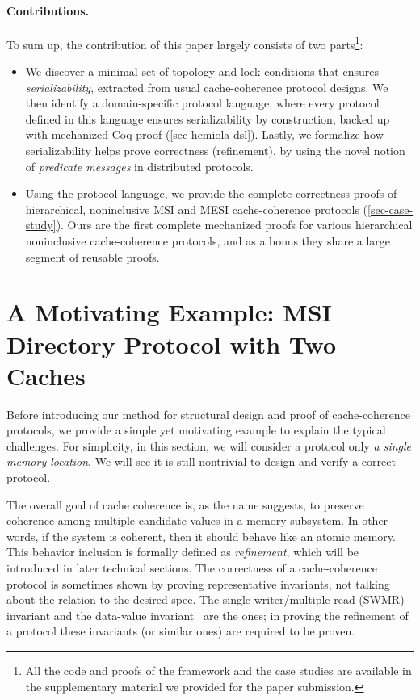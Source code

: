 \documentclass[sigplan,10pt,review,anonymous,screen]{acmart}\settopmatter{printfolios=true,printccs=false,printacmref=false}
\begin{document}
\paragraph{Contributions.}
To sum up, the contribution of this paper largely consists of two parts\footnote{All the code and proofs of the framework and the case studies are available in the supplementary material we provided for the paper submission.}:
\begin{itemize}[leftmargin=*]
\item We discover a minimal set of topology and lock conditions that ensures \emph{serializability}, extracted from usual cache-coherence protocol designs. We then identify a domain-specific protocol language, where every protocol defined in this language ensures serializability by construction, backed up with mechanized Coq proof (\autoref{sec-hemiola-dsl}). Lastly, we formalize how serializability helps prove correctness (refinement), by using the novel notion of \emph{predicate messages} in distributed protocols.
\item Using the protocol language, we provide the complete correctness proofs of hierarchical, noninclusive MSI and MESI cache-coherence protocols (\autoref{sec-case-study}). Ours are the first complete mechanized proofs for various hierarchical noninclusive cache-coherence protocols, and as a bonus they share a large segment of reusable proofs.
\end{itemize}

\section{A Motivating Example: MSI Directory Protocol with Two Caches}
\label{sec-example}

Before introducing our method for structural design and proof of cache-coherence protocols, we provide a simple yet motivating example to explain the typical challenges.
For simplicity, in this section, we will consider a protocol only \emph{a single memory location}.
We will see it is still nontrivial to design and verify a correct protocol.

The overall goal of cache coherence is, as the name suggests, to preserve coherence among multiple candidate values in a memory subsystem.
In other words, if the system is coherent, then it should behave like an atomic memory.
This behavior inclusion is formally defined as \emph{refinement}, which will be introduced in later technical sections.
The correctness of a cache-coherence protocol is sometimes shown by proving representative invariants, not talking about the relation to the desired spec.
The single-writer/multiple-read (SWMR) invariant and the data-value invariant~\cite{ccbook:2020} are the ones; in proving the refinement of a protocol these invariants (or similar ones) are required to be proven.
\end{document}

